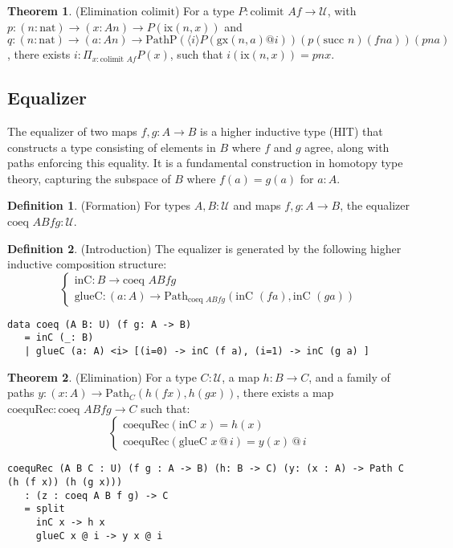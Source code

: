 \documentclass{article}
\theoremstyle{definition}
\newtheorem{theorem}{Theorem}
\newtheorem{definition}{Definition}
\begin{document}
\begin{theorem} (Elimination $\text{colimit}$)
For a type $P : \text{colimit } A f \to \mathcal{U}$, with $p : (n : \text{nat}) \to (x : A n) \to P(\text{ix}(n, x))$ and $q : (n : \text{nat}) \to (a : A n) \to \text{PathP} (\langle i \rangle P(\text{gx}(n, a) @ i)) (p (\text{succ } n) (f n a)) (p n a)$, there exists $i : \Pi_{x:\text{colimit } A f} P(x)$, such that $i(\text{ix}(n, x)) = p n x$.
\end{theorem}

\newpage

\subsection{Equalizer}
The equalizer of two maps $f, g : A \to B$ is a higher inductive type (HIT) that constructs a type consisting of elements in $B$ where $f$ and $g$ agree, along with paths enforcing this equality. It is a fundamental construction in homotopy type theory, capturing the subspace of $B$ where $f(a) = g(a)$ for $a : A$.

\begin{definition} (Formation)
For types $A, B : \mathcal{U}$ and maps $f, g : A \to B$, the equalizer $\text{coeq } A B f g : \mathcal{U}$.
\end{definition}

\begin{definition} (Introduction)
The equalizer is generated by the following higher inductive composition structure:
\[
\begin{cases}
\text{inC} : B \to \text{coeq } A B f g \\
\text{glueC} : (a : A) \to \text{Path}_{\text{coeq } A B f g} (\text{inC } (f a), \text{inC } (g a))
\end{cases}
\]
\begin{lstlisting}
data coeq (A B: U) (f g: A -> B)
   = inC (_: B)
   | glueC (a: A) <i> [(i=0) -> inC (f a), (i=1) -> inC (g a) ]
\end{lstlisting}
\end{definition}

\begin{theorem} (Elimination)
For a type $C : \mathcal{U}$, a map $h : B \to C$, and a family of paths $y : (x : A) \to \text{Path}_C (h (f x), h (g x))$, there exists a map $\text{coequRec} : \text{coeq } A B f g \to C$ such that:
\[
\begin{cases}
\text{coequRec}(\text{inC } x) = h(x) \\
\text{coequRec}(\text{glueC } x \, @ \, i) = y(x) \, @ \, i
\end{cases}
\]
\begin{lstlisting}
coequRec (A B C : U) (f g : A -> B) (h: B -> C) (y: (x : A) -> Path C (h (f x)) (h (g x)))
   : (z : coeq A B f g) -> C
   = split
     inC x -> h x
     glueC x @ i -> y x @ i
\end{lstlisting}
\end{theorem}
\end{document}
